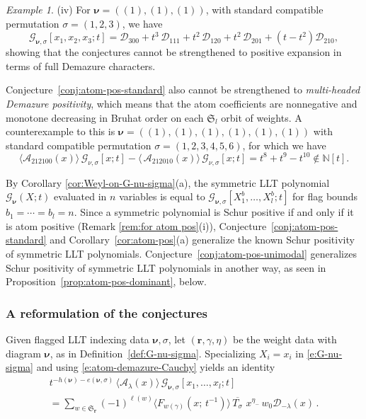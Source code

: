 \documentclass[12pt]{amsart}
\theoremstyle{definition}
\theoremstyle{remark}
\newtheorem{example}[thm]{Example}
\newcommand{\NN}{{\mathbb N}}
\newcommand{\rr}{{\mathbf r}}
\newcommand{\nubold}{{\boldsymbol \nu }}
\newcommand{\Sfrak}{{\mathfrak S}}
\newcommand{\Acal}{{\mathcal A}}
\newcommand{\Dcal}{{\mathcal D}}
\newcommand{\Gcal}{{\mathcal G}}
\begin{document}
\begin{example}
(iv) For $\nubold =((1),(1),(1))$, with standard
compatible permutation $\sigma =(1,2,3)$, we have
\begin{equation}
\Gcal _{\nubold, \sigma }[x_{1},x_{2},x_{3}; t] = \Dcal _{300} + t^3\,
\Dcal _{111} + t^2\, \Dcal _{120} + t^2\, \Dcal _{201} +
\left(t-t^2\right) \Dcal _{210},
\end{equation}
showing that the conjectures cannot be strengthened to positive
expansion in terms of full Demazure characters.

Conjecture~\ref{conj:atom-pos-standard} also cannot be strengthened to
{\em multi-headed Demazure positivity}, which means that the atom
coefficients are nonnegative and monotone decreasing in Bruhat order
on each $\Sfrak _{l}$ orbit of weights.  A counterexample to this is
$\nubold =((1),(1),(1),(1),(1),(1))$ with standard compatible
permutation $\sigma =(1,2,3,4,5,6)$, for which we have
\begin{equation}
\langle \Acal _{212100}(x) \rangle \, \Gcal _{\nu ,\sigma }[x; t] -
\langle \, \Acal _{212010}(x) \rangle \, \Gcal _{\nu ,\sigma }[x; t] =
t^{8} + t^{9} - t^{10}\not \in \NN [t].
\end{equation}
\end{example}

By Corollary \ref{cor:Weyl-on-G-nu-sigma}(a), the symmetric LLT
polynomial $\Gcal _{\nubold }(X;t)$ evaluated in $n$ variables is
equal to $\Gcal _{\nubold ,\sigma }[X^{b}_{1},\ldots,X^{b}_{l}; t]$
for flag bounds $b_{1}=\cdots =b_{l} = n$.  Since a symmetric
polynomial is Schur positive if and only if it is atom positive
(Remark \ref{rem:for atom pos}(i)),
Conjecture~\ref{conj:atom-pos-standard} and
Corollary~\ref{cor:atom-pos}(a) generalize the known Schur
positivity of symmetric LLT polynomials.
Conjecture~\ref{conj:atom-pos-unimodal} generalizes Schur positivity
of symmetric LLT polynomials in another way, as seen in
Proposition~\ref{prop:atom-pos-dominant}, below.

\subsubsection*{A reformulation of the conjectures}

Given flagged LLT indexing data $\nubold ,\sigma $, let $(\rr ,\gamma
,\eta )$ be the weight data with diagram $\nubold $, as in
Definition~\ref{def:G-nu-sigma}.  Specializing $X_{i} = x_{i}$ in
\eqref{e:G-nu-sigma} and using \eqref{e:atom-demazure-Cauchy}
yields an identity
\begin{multline}\label{e:atom-coefs-via-D}
t^{-h(\nubold )-e(\nubold ,\sigma )}\, \langle \Acal _{\lambda }(x)
\rangle\, \Gcal _{\nubold ,\sigma } [x_{1},\ldots,x_{l};t] \\
= \sum _{w\in \Sfrak _{\rr }} (-1)^{\ell (w)} \langle F_{w(\gamma
)}(x;\, t^{-1}) \rangle\, \overline{T_{\sigma }}\, \, x^{\eta _{-}}\,
w_{0} \Dcal _{-\lambda }(x)\, .
\end{multline}
\end{document}
